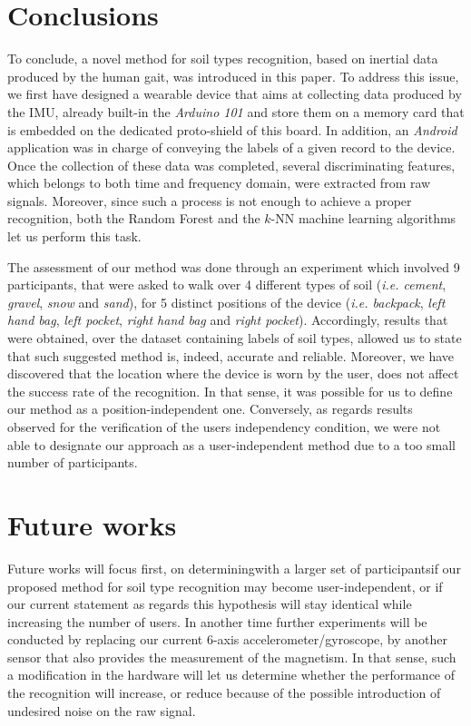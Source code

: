 \documentclass[conference]{IEEEtran}
\begin{document}
\section{Conclusions}

To conclude, a novel method for soil types recognition, based on inertial data produced by the human gait, was introduced in this paper. To address this issue, we first have designed a wearable device that aims at collecting data produced by the IMU, already built-in the \textit{Arduino 101} and store them on a memory card that is embedded on the dedicated proto-shield of this board. In addition, an \textit{Android} application was in charge of conveying the labels of a given record to the device. Once the collection of these data was completed, several discriminating features, which belongs to both time and frequency domain, were extracted from raw signals. Moreover, since such a process is not enough to achieve a proper recognition, both the Random Forest and the $k$-NN machine learning algorithms let us perform this task.  

The assessment of our method was done through an experiment which involved 9 participants, that were asked to walk over 4 different types of soil (\textit{i.e. cement}, \textit{gravel}, \textit{snow} and \textit{sand}), for 5 distinct positions of the device (\textit{i.e. backpack}, \textit{left hand bag}, \textit{left pocket}, \textit{right hand bag} and \textit{right pocket}). Accordingly, results that were obtained, over the dataset containing labels of soil types, allowed us to state that such suggested method is, indeed, accurate and reliable. Moreover, we have discovered that the location where the device is worn by the user, does not affect the success rate of the recognition. In that sense, it was possible for us to define our method as a position-independent one. Conversely, as regards results observed for the verification of the user\textquotesingle s independency condition, we were not able to designate our approach as a user-independent method due to a too small number of participants.

\section{Future works}

Future works will focus first, on determining\textemdash with a larger set of participants\textemdash if our proposed method for soil type recognition may become user-independent, or if our current statement as regards this hypothesis will stay identical while increasing the number of users. In another time further experiments will be conducted by replacing our current 6-axis accelerometer/gyroscope, by another sensor that also provides the measurement of the magnetism. In that sense, such a modification in the hardware will let us determine whether the performance of the recognition will increase, or reduce because of the possible introduction of undesired noise on the raw signal.
\end{document}
